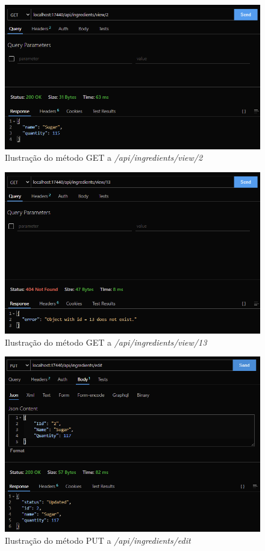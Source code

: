 \FloatBarrier
\begin{figure}[!hbt]
    \centering
    \includegraphics[width=14cm]{Resources/API/Ingredients/Ingredients (4).png}
    \caption{Ilustração do método GET a \textit{/api/ingredients/view/2}}
    \label{fig:api_ing_4}
\end{figure}
\FloatBarrier
\begin{figure}[!hbt]
    \centering
    \includegraphics[width=14cm]{Resources/API/Ingredients/Ingredients (5).png}
    \caption{Ilustração do método GET a \textit{/api/ingredients/view/13}}
    \label{fig:api_ing_5}
\end{figure}
\FloatBarrier
\begin{figure}[!hbt]
    \centering
    \includegraphics[width=14cm]{Resources/API/Ingredients/Ingredients (6).png}
    \caption{Ilustração do método PUT a \textit{/api/ingredients/edit}}
    \label{fig:api_ing_6}
\end{figure}
